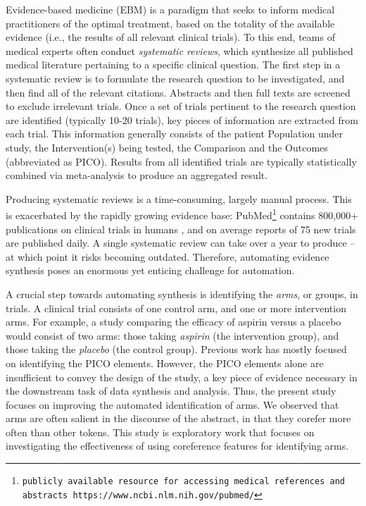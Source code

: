 Evidence-based medicine (EBM) is a paradigm that seeks to inform medical practitioners of the optimal treatment, based on the totality of the available evidence (i.e., the results of all relevant clinical trials). To this end, teams of medical experts often conduct \textit{systematic reviews}, which synthesize all published medical literature pertaining to a specific clinical question. The first step in a systematic review is to formulate the research question to be investigated, and then find all of the relevant citations. Abstracts and then full texts are screened to exclude irrelevant trials. Once a set of trials pertinent to the research question are identified (typically 10-20 trials), key pieces of information are extracted from each trial. This information generally consists of the patient Population under study, the Intervention(s) being tested, the Comparison and the Outcomes (abbreviated as PICO). Results from all identified trials are typically statistically combined via meta-analysis to produce an aggregated result. 


Producing systematic reviews is a time-consuming, largely manual process. This is exacerbated by the rapidly growing evidence base: PubMed\footnote{\tt publicly available resource for accessing medical references and abstracts https://www.ncbi.nlm.nih.gov/pubmed/} contains 800,000+ publications on clinical trials in humans \cite{Wallace:2013}, and on average reports of 75 new trials are published daily.  A single systematic review can take over a year to produce -- at which point it risks becoming outdated. Therefore, automating evidence synthesis poses an enormous yet enticing challenge for automation. %

A crucial step towards automating synthesis is identifying the \textit{arms}, or groups, in trials. A clinical trial consists of one control arm, and one or more  intervention arms. For example, a study comparing the efficacy of aspirin versus a placebo would consist of two arms: those taking \textit{aspirin} (the intervention group), and those taking the \textit{placebo} (the control group). Previous work has mostly focused on identifying the PICO elements. However, the PICO elements alone are insufficient to convey the design of the study, a key piece of evidence necessary in the downstream task of data synthesis and analysis. Thus, the present study focuses on improving the automated identification of arms. We observed that arms are often salient in the discourse of the abstract, in that they corefer more often than other tokens. This study is exploratory work that focuses on investigating the effectiveness of using coreference features for identifying arms. %

